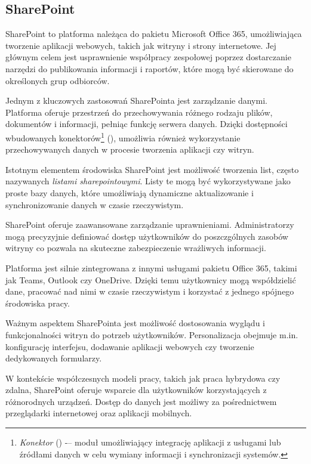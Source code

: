 \subsection{SharePoint}
SharePoint to platforma należąca do pakietu Microsoft Office 365, umożliwiająca tworzenie aplikacji webowych, takich jak witryny i strony internetowe. Jej głównym celem jest usprawnienie współpracy zespołowej poprzez dostarczanie narzędzi do publikowania informacji i raportów, które mogą być skierowane do określonych grup odbiorców. \par
Jednym z kluczowych zastosowań SharePointa jest zarządzanie danymi. Platforma oferuje przestrzeń do przechowywania różnego rodzaju plików, dokumentów i informacji, pełniąc funkcję serwera danych. Dzięki dostępności wbudowanych konektorów\footnote{\emph{Konektor} () -– moduł umożliwiający integrację aplikacji z usługami lub źródłami danych w celu wymiany informacji i synchronizacji systemów.} (), umożliwia również wykorzystanie przechowywanych danych w procesie tworzenia aplikacji czy witryn. \par
Istotnym elementem środowiska SharePoint jest możliwość tworzenia list, często nazywanych \emph{listami sharepointowymi}. Listy te mogą być wykorzystywane jako proste bazy danych, które umożliwiają dynamiczne aktualizowanie i synchronizowanie danych w czasie rzeczywistym. \par
SharePoint oferuje zaawansowane zarządzanie uprawnieniami. Administratorzy mogą precyzyjnie definiować dostęp użytkowników do poszczgólnych zasobów witryny co pozwala na skuteczne zabezpieczenie wrażliwych informacji. \par
Platforma jest silnie zintegrowana z innymi usługami pakietu Office 365, takimi jak Teams, Outlook czy OneDrive. Dzięki temu użytkownicy mogą współdzielić dane, pracować nad nimi w czasie rzeczywistym i korzystać z jednego spójnego środowiska pracy. \par
Ważnym aspektem SharePointa jest możliwość dostosowania wyglądu i funkcjonalności witryn do potrzeb użytkowników. Personalizacja obejmuje m.in. konfigurację interfejsu, dodawanie aplikacji webowych czy tworzenie dedykowanych formularzy. \par
W kontekście współczesnych modeli pracy, takich jak praca hybrydowa czy zdalna, SharePoint oferuje wsparcie dla użytkowników korzystających z różnorodnych urządzeń. Dostęp do danych jest możliwy za pośrednictwem przeglądarki internetowej oraz aplikacji mobilnych.

\begin{comment}
SharePoint to platforma wchodząca w skład pakietu Office 365, która służy do zarządzania dokumentami oraz umożliwia efektywną współpracę zespołową. Dzięki niej użytkownicy mogą tworzyć i korzystać z własnych przestrzeni roboczych online, takich jak listy czy  archiwa plików, co znacząco ułatwia organizację oraz szybki dostęp do danych.

Listy sharepointowe mogą pełnić funkcję prostych baz danych, które można łatwo zintegrować z takimi narzędziami jak PowerApps, PowerAutomate, czy Excel. Takie rozwiązanie umożliwia dynamiczne aktualizowanie i synchronizowanie danych w czasie rzeczywistym.
\end{comment}


